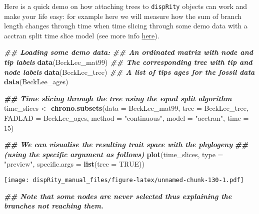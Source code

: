 \documentclass[
]{book}
\newenvironment{Shaded}{\begin{snugshade}}{\end{snugshade}}
\newcommand{\AttributeTok}[1]{\textcolor[rgb]{0.13,0.29,0.53}{#1}}
\newcommand{\ConstantTok}[1]{\textcolor[rgb]{0.56,0.35,0.01}{#1}}
\newcommand{\DecValTok}[1]{\textcolor[rgb]{0.00,0.00,0.81}{#1}}
\newcommand{\DocumentationTok}[1]{\textcolor[rgb]{0.56,0.35,0.01}{\textbf{\textit{#1}}}}
\newcommand{\FunctionTok}[1]{\textcolor[rgb]{0.13,0.29,0.53}{\textbf{#1}}}
\newcommand{\NormalTok}[1]{#1}
\newcommand{\OtherTok}[1]{\textcolor[rgb]{0.56,0.35,0.01}{#1}}
\newcommand{\StringTok}[1]{\textcolor[rgb]{0.31,0.60,0.02}{#1}}
\begin{document}
Here is a quick demo on how attaching trees to \texttt{dispRity} objects can work and make your life easy: for example here we will measure how the sum of branch length changes through time when time slicing through some demo data with a acctran split time slice model (see more info \protect\hyperlink{chrono-subsets}{here}).

\begin{Shaded}
\begin{Highlighting}[]
\DocumentationTok{\#\# Loading some demo data:}
\DocumentationTok{\#\# An ordinated matrix with node and tip labels}
\FunctionTok{data}\NormalTok{(BeckLee\_mat99)}
\DocumentationTok{\#\# The corresponding tree with tip and node labels}
\FunctionTok{data}\NormalTok{(BeckLee\_tree)}
\DocumentationTok{\#\# A list of tips ages for the fossil data}
\FunctionTok{data}\NormalTok{(BeckLee\_ages)}

\DocumentationTok{\#\# Time slicing through the tree using the equal split algorithm}
\NormalTok{time\_slices }\OtherTok{\textless{}{-}} \FunctionTok{chrono.subsets}\NormalTok{(}\AttributeTok{data   =}\NormalTok{ BeckLee\_mat99,}
                              \AttributeTok{tree   =}\NormalTok{ BeckLee\_tree,}
                              \AttributeTok{FADLAD =}\NormalTok{ BeckLee\_ages,}
                              \AttributeTok{method =} \StringTok{"continuous"}\NormalTok{,}
                              \AttributeTok{model  =} \StringTok{"acctran"}\NormalTok{,}
                              \AttributeTok{time   =} \DecValTok{15}\NormalTok{)}

\DocumentationTok{\#\# We can visualise the resulting trait space with the phylogeny}
\DocumentationTok{\#\# (using the specific argument as follows)}
\FunctionTok{plot}\NormalTok{(time\_slices, }\AttributeTok{type =} \StringTok{"preview"}\NormalTok{,}
     \AttributeTok{specific.args =} \FunctionTok{list}\NormalTok{(}\AttributeTok{tree =} \ConstantTok{TRUE}\NormalTok{))}
\end{Highlighting}
\end{Shaded}

\texttt{[image: dispRity\_manual\_files/figure-latex/unnamed-chunk-130-1.pdf]}

\begin{Shaded}
\begin{Highlighting}[]
\DocumentationTok{\#\# Note that some nodes are never selected thus explaining the branches not reaching them.}
\end{Highlighting}
\end{Shaded}
\end{document}
